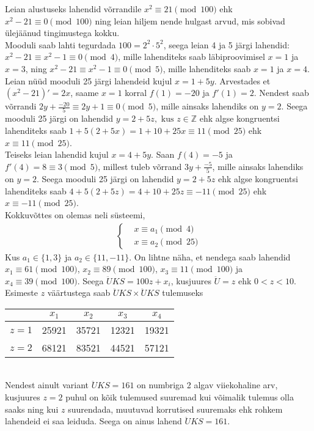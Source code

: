 \documentclass[a4paper, 10pt]{article}
\newcommand{\Z}{\mathbb{Z}}
\begin{document}
\bigskip
Leian alustuseks lahendid võrrandile $x^2\equiv21\pmod{100}$ ehk $x^2-21\equiv0\pmod{100}$ ning leian hiljem nende hulgast arvud, mis sobivad ülejäänud tingimustega kokku.\\
Mooduli saab lahti tegurdada $100=2^2\cdot5^2$, seega leian 4 ja 5 järgi lahendid: $x^2-21\equiv x^2-1\equiv0\pmod{4}$, mille lahenditeks saab läbiproovimisel $x=1$ ja $x=3$, ning $x^2-21\equiv x^2-1\equiv0\pmod5$, mille lahenditeks saab  $x=1$ ja $x=4$.\\
Leian nüüd mooduli 25 järgi lahendeid kujul $x=1+5y$. Arvestades et $(x^2-21)'=2x$, saame $x=1$ korral $f(1)=-20$ ja $f'(1)=2$. Nendest saab võrrandi $2y+\frac{-20}{5}\equiv2y+1\equiv0\pmod5$, mille ainsaks lahendiks on $y=2$. Seega mooduli 25 järgi on lahendid $y=2+5z,\text{ kus }z\in\Z$ ehk algse kongruentsi lahenditeks saab $1+5(2+5x)=1+10+25x\equiv11\pmod{25}$ ehk $x\equiv11\pmod{25}$.\\
Teiseks leian lahendid kujul $x=4+5y$. Saan $f(4)=-5$ ja $f'(4)=8\equiv3\pmod5$, millest tuleb võrrand $3y+\frac{-5}{5}$, mille ainsaks lahendiks on $y=2$. Seega mooduli 25 järgi on lahendid $y=2+5z$ ehk algse kongruentsi lahenditeks saab $4+5(2+5z)=4+10+25z\equiv-11\pmod{25}$ ehk $x\equiv-11\pmod{25}$.\\
Kokkuvõttes on olemas neli süsteemi, 
\begin{gather*}
\left\{
\begin{aligned}
&x\equiv a_1\pmod4\\
&x\equiv a_2\pmod{25}
\end{aligned}
\right.
\end{gather*}
Kus $a_1\in\{1,3\}$ ja $a_2\in\{11,-11\}$. On lihtne näha, et nendega saab lahendid $x_1\equiv61\pmod{100}$, $x_2\equiv89\pmod{100}$, $x_3\equiv11\pmod{100}$ ja $x_4\equiv39\pmod{100}$. Seega $\ddot{U}KS=100z+x_i$, kusjuures $\ddot{U}=z$ ehk $0<z<10$. Esimeste $z$ väärtustega saab $\ddot{U}KS\times \ddot{U}KS$ tulemuseks\\
\begin{tabular}{c|c|c|c|c}
&$x_1$&$x_2$&$x_3$&$x_4$\\
\hline
$z=1$&25921&35721&12321&19321\\
$z=2$&68121&83521&44521&57121
\end{tabular}\\
Nendest ainult variant $\ddot{U}KS=161$ on numbriga 2 algav viiekohaline arv, kusjuures $z=2$ puhul on kõik tulemused suuremad kui võimalik tulemus olla saaks ning kui $z$ suurendada, muutuvad korrutised suuremaks ehk rohkem lahendeid ei saa leiduda. Seega on ainus lahend $\ddot{U}KS=161$.
\bigskip
\end{document}
